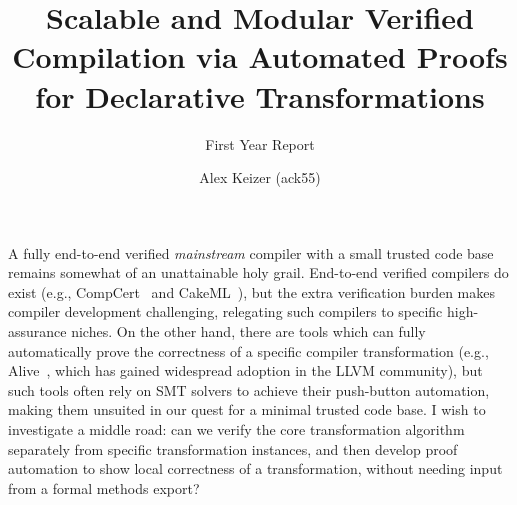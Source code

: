 \documentclass[a4paper]{scrartcl}
\begin{document}
\title{Scalable and Modular Verified Compilation via Automated Proofs
for Declarative
Transformations}
\subtitle{First Year Report}

\author{Alex Keizer \small{(ack55)}}
\date{}



\maketitle

A fully end-to-end verified \emph{mainstream} compiler with a small
trusted code base remains somewhat of an unattainable holy grail.
End-to-end verified compilers do exist (e.g., CompCert~\cite{leroyCompCertFormallyVerified} and CakeML~\cite{kumarCakeMLVerifiedImplementation2014}), but the extra
verification burden makes compiler development challenging, relegating
such compilers to specific high-assurance niches. On the other hand,
there are tools which can fully automatically prove the correctness of a
specific compiler transformation (e.g., Alive~\cite{lopesAlive2BoundedTranslation2021}, which has gained
widespread adoption in the LLVM community), but such tools
often rely on SMT solvers to achieve their push-button automation,
making them unsuited in our quest for a minimal trusted code base. I
wish to investigate a middle road: can we verify the core transformation
algorithm separately from specific transformation instances, and then
develop proof automation to show local
correctness of a transformation, without needing input from a formal methods export?
\end{document}
